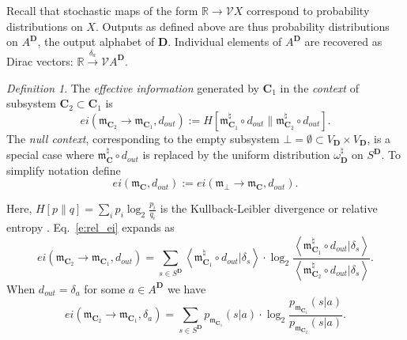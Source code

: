 \documentclass[12pt]{article}
\newcommand{\vecify}{{\mathcal V}}
\newcommand{\Act}{{A}}
\newcommand{\act}{{a}}
\newcommand{\Sit}{{S}}
\newcommand{\univ}{{\mathbf D}}
\newcommand{\uout}{{d_{out}}}
\newcommand{\mangle}{{\mathbf C}}
\newcommand{\bR}{{\mathbb R}}
\newcommand{\fm}{{\mathfrak m}}
\theoremstyle{remark}
\newtheorem{defn}{Definition}
\begin{document}

Recall that stochastic maps of the form $\bR\rightarrow \vecify 
X$ correspond to probability distributions on $X$. Outputs as 
defined above are thus probability distributions on 
$\Act^\univ$, the output alphabet of $\univ$. Individual 
elements of $\Act^\univ$ are recovered as Dirac vectors: 
$\bR\xrightarrow{\delta_\act}\vecify\Act^\univ$.

\begin{defn}
	\label{d:ei}
	The \emph{effective information} generated by $\mangle_1$ 
    in the \emph{context} of subsystem $\mangle_2\subset 
    \mangle_1$ is
\begin{equation}
	\label{e:rel_ei}
	ei(\fm_{\mangle_2}\rightarrow \fm_{\mangle_1}, \uout) := 
	H\left[\fm_{\mangle_1}^\natural\circ \uout\Big\|
    \fm_{\mangle_2}^\natural\circ \uout\right].
\end{equation}
The \emph{null context}, corresponding to the empty subsystem 
$\bot=\emptyset\subset V_\univ\times V_\univ$, is a special 
case where $\fm_\mangle^\natural\circ \uout$ is replaced by the 
uniform distribution $\omega_\univ^\natural$ on $\Sit^\univ$. 
To simplify notation define
\begin{equation*}
	ei(\fm_\mangle,\uout):=ei(\fm_\bot\rightarrow\fm_\mangle,
    \uout).
\end{equation*}
\end{defn}

Here, $H[p\|q]=\sum_{i}p_i\log_2\frac{p_i}{q_i}$ is the 
Kullback-Leibler divergence or relative entropy 
\cite{jaynes:81}. Eq.~\eqref{e:rel_ei} expands as
\begin{equation}
    ei(\fm_{\mangle_2}\rightarrow \fm_{\mangle_1},\uout) 
	 = \sum_{s\in \Sit^\univ} \left\langle
     \fm^\natural_{\mangle_1}\circ \uout\Big|
     \delta_s\right\rangle
	\cdot \log_2 \frac{\left\langle\fm^\natural_{\mangle_1}
    \circ \uout\Big|\delta_s\right\rangle}
	{\left\langle\fm^\natural_{\mangle_2}\circ \uout\Big|
    \delta_s\right\rangle}.
\end{equation}
When $d_{out}=\delta_\act$ for some $\act\in \Act^\univ$ we 
have
\begin{equation}
	ei(\fm_{\mangle_2}\rightarrow \fm_{\mangle_1},\delta_\act)
	= \sum_{s\in\Sit^\univ} p_{\fm_{\mangle_1}}(s|\act)\cdot
    \log_2
	\frac{p_{\fm_{\mangle_1}}(s|\act)}{p_{\fm_{\mangle_2}}
    (s|\act)}.
\end{equation}
\end{document}
